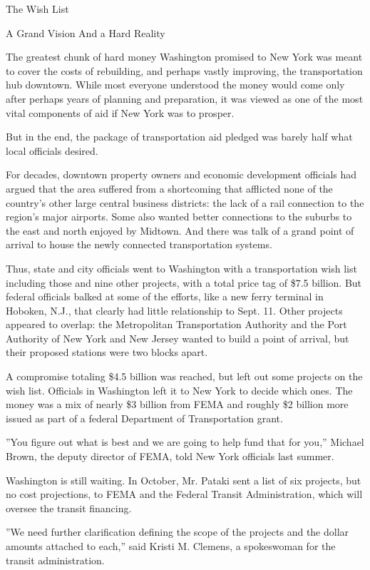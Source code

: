 The Wish List

A Grand Vision And a Hard Reality

The greatest chunk of hard money Washington promised to New York was
meant to cover the costs of rebuilding, and perhaps vastly improving,
the transportation hub downtown. While most everyone understood the
money would come only after perhaps years of planning and preparation,
it was viewed as one of the most vital components of aid if New York was
to prosper.

But in the end, the package of transportation aid pledged was barely
half what local officials desired.

For decades, downtown property owners and economic development officials
had argued that the area suffered from a shortcoming that afflicted none
of the country's other large central business districts: the lack of a
rail connection to the region's major airports. Some also wanted better
connections to the suburbs to the east and north enjoyed by Midtown. And
there was talk of a grand point of arrival to house the newly connected
transportation systems.

Thus, state and city officials went to Washington with a transportation
wish list including those and nine other projects, with a total price
tag of \$7.5 billion. But federal officials balked at some of the
efforts, like a new ferry terminal in Hoboken, N.J., that clearly had
little relationship to Sept. 11. Other projects appeared to overlap: the
Metropolitan Transportation Authority and the Port Authority of New York
and New Jersey wanted to build a point of arrival, but their proposed
stations were two blocks apart.

A compromise totaling \$4.5 billion was reached, but left out some
projects on the wish list. Officials in Washington left it to New York
to decide which ones. The money was a mix of nearly \$3 billion from
FEMA and roughly \$2 billion more issued as part of a federal Department
of Transportation grant.

''You figure out what is best and we are going to help fund that for
you,'' Michael Brown, the deputy director of FEMA, told New York
officials last summer.

Washington is still waiting. In October, Mr. Pataki sent a list of six
projects, but no cost projections, to FEMA and the Federal Transit
Administration, which will oversee the transit financing.

''We need further clarification defining the scope of the projects and
the dollar amounts attached to each,'' said Kristi M. Clemens, a
spokeswoman for the transit administration.

